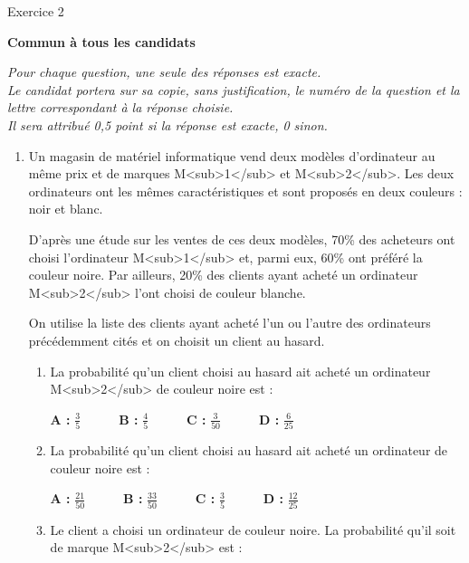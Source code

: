 
%
\begin{h2}Exercice 2\end{h2}
\textbf{Commun à tous les candidats}
\par
\textit{Pour chaque question, une seule des réponses est exacte.}
\\
\textit{Le candidat portera sur sa copie, sans justification, le numéro de la question et la lettre correspondant à la réponse choisie.}
\\
\textit{Il sera attribué 0,5 point si la réponse est exacte, 0 sinon.}
\begin{enumerate}
     \item
     Un magasin de matériel informatique vend deux modèles d'ordinateur au même prix et de marques M<sub>1</sub> et M<sub>2</sub>. Les deux ordinateurs ont les mêmes caractéristiques et sont proposés en deux couleurs : noir et blanc.
     \par
     D'après une étude sur les ventes de ces deux modèles, 70\% des acheteurs ont choisi l'ordinateur M<sub>1</sub> et, parmi eux, 60\% ont préféré la couleur noire. Par ailleurs, 20\% des clients ayant acheté un ordinateur M<sub>2</sub> l'ont choisi de couleur blanche.
     \par
     On utilise la liste des clients ayant acheté l'un ou l'autre des ordinateurs précédemment cités et on choisit un client au hasard.
     \begin{enumerate}
          \item
          La probabilité qu'un client choisi au hasard ait acheté un ordinateur M<sub>2</sub> de couleur noire est :
\par
          \textbf{A :} $\frac{3}{5}$$ \quad  \quad  \quad $\textbf{B :} $\frac{4}{5}$$ \quad  \quad  \quad $\textbf{C :} $\frac{3}{50}$$ \quad  \quad  \quad $\textbf{D :} $\frac{6}{25}$
          \item
          La probabilité qu'un client choisi au hasard ait acheté un ordinateur de couleur noire est :
\par
          \textbf{A :} $\frac{21}{50}$$ \quad  \quad  \quad $\textbf{B :} $\frac{33}{50}$$ \quad  \quad  \quad $\textbf{C :} $\frac{3}{5}$$ \quad  \quad  \quad $\textbf{D :} $\frac{12}{25}$
          \item
          Le client a choisi un ordinateur de couleur noire. La probabilité qu'il soit de marque M<sub>2</sub> est :

\end{enumerate}
\end{enumerate}
